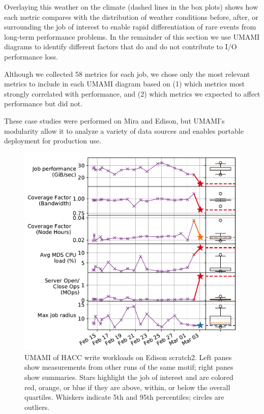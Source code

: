 Overlaying this weather on the climate (dashed lines in the box plots) shows how each metric compares with the distribution of weather conditions before, after, or surrounding the job of interest to enable rapid differentiation of rare events from long-term performance problems.
In the remainder of this section we use UMAMI diagrams to identify different factors that do and do not contribute to I/O performance loss.
{Although we collected 58 metrics for each job, we chose only the most relevant metrics to include in each UMAMI diagram based on (1) which metrics most strongly correlated with performance, and (2) which metrics we expected to affect performance but did not.

These case studies were performed on Mira and Edison, but UMAMI's modularity allow it to analyze a variety of data sources and enables portable deployment for production use.

\begin{figure}[t]
    \centering
    \includegraphics[width=1.0\columnwidth]{figs/umami-scratch2-hacc-write.pdf}
    \vspace{-.35in}
    \caption{UMAMI of HACC write workloads on Edison scratch2.
    Left panes show measurements from other runs of the same motif; right panes show summaries.
    Stars highlight the job of interest and are colored red, orange, or blue if they are above, within, or below the overall quartiles.
    Whiskers indicate 5th and 95th percentiles; circles are outliers.}
    \label{fig:umami-scratch2-hacc-write}
    \vspace{-.2in}
\end{figure}

}
